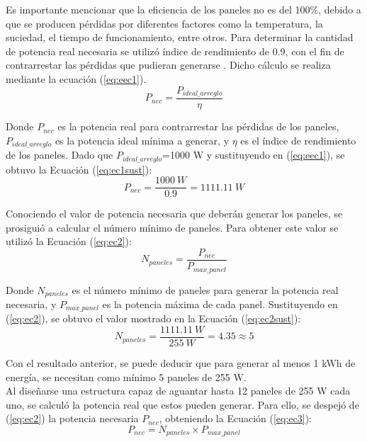 Es importante mencionar que la eficiencia de los paneles no es del 100\%, debido a que se producen pérdidas por diferentes factores como la temperatura, la suciedad, el tiempo de funcionamiento, entre otros. Para determinar la cantidad de potencia real necesaria se utilizó índice de rendimiento de 0.9, con el fin de contrarrestar las pérdidas que pudieran generarse \cite{DDE2}. Dicho cálculo se realiza mediante la ecuación (\ref{eq:eec1}).\\
\begin{equation}\label{eq:eec1}
P_{nec} = \frac{P_{ideal\_arreglo}}{\eta} 
\end{equation}

Donde $P_{nec}$ es la potencia real para contrarrestar las pérdidas de los paneles, $P_{ideal\_arreglo}$ es la potencia ideal mínima a generar, y $\eta$ es el índice de rendimiento de los paneles. Dado que $P_{ideal\_arreglo}$=1000 W y sustituyendo en (\ref{eq:eec1}), se obtuvo la Ecuación (\ref{eq:ec1sust}): 
\begin{equation}\label{eq:ec1sust}
P_{nec} = \frac{1000 \ W}{0.9} = 1111.11 \ W
\end{equation}

Conociendo el valor de potencia necesaria que deberán generar los paneles, se prosiguió a calcular el número mínimo de paneles. Para obtener este valor se utilizó la Ecuación (\ref{eq:ec2}):
\begin{equation}\label{eq:ec2}
N_{paneles} = \frac{P_{nec}}{P_{max\_panel}} 
\end{equation}

Donde $N_{paneles}$ es el número mínimo de paneles para generar la potencia real necesaria, y $P_{max\_panel}$ es la potencia máxima de cada panel. Sustituyendo en (\ref{eq:ec2}), se obtuvo el valor mostrado en la Ecuación (\ref{eq:ec2sust}):
\begin{equation}\label{eq:ec2sust}
N_{paneles} = \frac{1111.11 \ W}{255 \ W} = 4.35 \approx 5 
\end{equation}

Con el resultado anterior, se puede deducir que para generar al menos 1 kWh de energía, se necesitan como mínimo 5 paneles de 255 W.\\ 

Al diseñarse una estructura capaz de aguantar hasta 12 paneles de 255 W cada uno, se calculó la potencia real que estos pueden generar. Para ello, se despejó de (\ref{eq:ec2}) la potencia necesaria \textbf{\textit{$P_{nec}$}}, obteniendo la Ecuación (\ref{eq:ec3}):
\begin{equation}\label{eq:ec3}
P_{nec} = N_{paneles} \times P_{max\_panel}
\end{equation}

